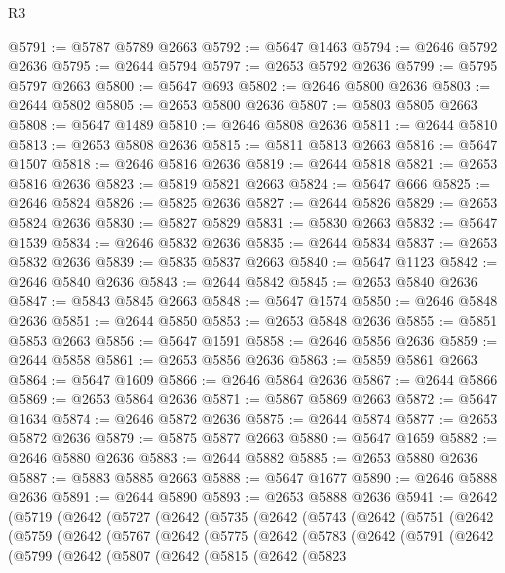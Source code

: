 \begin{lexlean}{R3}
\begin{coremodule}
@5791 := @5787 @5789 @2663
@5792 := @5647 @1463
@5794 := @2646 @5792 @2636
@5795 := @2644 @5794
@5797 := @2653 @5792 @2636
@5799 := @5795 @5797 @2663
@5800 := @5647 @693
@5802 := @2646 @5800 @2636
@5803 := @2644 @5802
@5805 := @2653 @5800 @2636
@5807 := @5803 @5805 @2663
@5808 := @5647 @1489
@5810 := @2646 @5808 @2636
@5811 := @2644 @5810
@5813 := @2653 @5808 @2636
@5815 := @5811 @5813 @2663
@5816 := @5647 @1507
@5818 := @2646 @5816 @2636
@5819 := @2644 @5818
@5821 := @2653 @5816 @2636
@5823 := @5819 @5821 @2663
@5824 := @5647 @666
@5825 := @2646 @5824
@5826 := @5825 @2636
@5827 := @2644 @5826
@5829 := @2653 @5824 @2636
@5830 := @5827 @5829
@5831 := @5830 @2663
@5832 := @5647 @1539
@5834 := @2646 @5832 @2636
@5835 := @2644 @5834
@5837 := @2653 @5832 @2636
@5839 := @5835 @5837 @2663
@5840 := @5647 @1123
@5842 := @2646 @5840 @2636
@5843 := @2644 @5842
@5845 := @2653 @5840 @2636
@5847 := @5843 @5845 @2663
@5848 := @5647 @1574
@5850 := @2646 @5848 @2636
@5851 := @2644 @5850
@5853 := @2653 @5848 @2636
@5855 := @5851 @5853 @2663
@5856 := @5647 @1591
@5858 := @2646 @5856 @2636
@5859 := @2644 @5858
@5861 := @2653 @5856 @2636
@5863 := @5859 @5861 @2663
@5864 := @5647 @1609
@5866 := @2646 @5864 @2636
@5867 := @2644 @5866
@5869 := @2653 @5864 @2636
@5871 := @5867 @5869 @2663
@5872 := @5647 @1634
@5874 := @2646 @5872 @2636
@5875 := @2644 @5874
@5877 := @2653 @5872 @2636
@5879 := @5875 @5877 @2663
@5880 := @5647 @1659
@5882 := @2646 @5880 @2636
@5883 := @2644 @5882
@5885 := @2653 @5880 @2636
@5887 := @5883 @5885 @2663
@5888 := @5647 @1677
@5890 := @2646 @5888 @2636
@5891 := @2644 @5890
@5893 := @2653 @5888 @2636
@5941 := @2642
    (@5719
      (@2642
        (@5727
          (@2642
            (@5735
              (@2642
                (@5743
                  (@2642
                    (@5751
                      (@2642
                        (@5759
                          (@2642
                            (@5767
                              (@2642
                                (@5775
                                  (@2642
                                    (@5783
                                      (@2642
                                        (@5791
                                          (@2642
                                            (@5799
                                              (@2642
                                                (@5807
                                                  (@2642
                                                    (@5815
                                                      (@2642
                                                        (@5823

\end{coremodule}
\end{lexlean}
